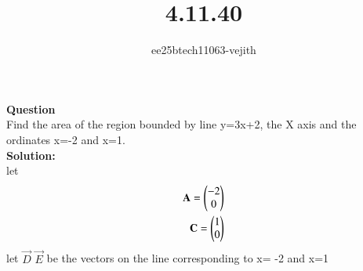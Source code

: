 \documentclass[journal]{IEEEtran}
\begin{document}

\vspace{3cm}

\title{4.11.40}
\author{ee25btech11063-vejith}

\maketitle
{\let\newpage\relax\maketitle}
\renewcommand{\thefigure}{\theenumi}
\renewcommand{\thetable}{\theenumi}
\setlength{\intextsep}{10pt} %
\textbf{Question}\\
Find the area of the region bounded by line y=3x+2, the X axis and the ordinates x=-2 and x=1.\\
\textbf{Solution:}\\
let
\begin{align}
    \mathbf{A}=\begin{pmatrix}-2\\0\end{pmatrix}\\
    \mathbf{C}=\begin{pmatrix}1\\0\end{pmatrix}\\
    \end{align}
let $\vec{D}$  $\vec{E}$ be the vectors on the line corresponding to x= -2 and x=1\\
\end{document}
